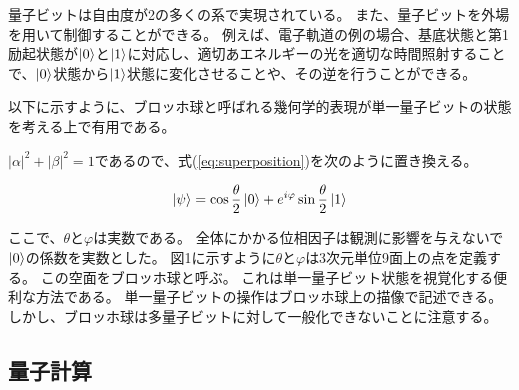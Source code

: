 \documentclass[platex,dvipdfmx]{jlreq}			%
\begin{document}
量子ビットは自由度が2の多くの系で実現されている。
また、量子ビットを外場を用いて制御することができる。
例えば、電子軌道の例の場合、基底状態と第1励起状態が$\ket{0}$と$\ket{1}$に対応し、適切あエネルギーの光を適切な時間照射することで、$\ket{0}$状態から$\ket{1}$状態に変化させることや、その逆を行うことができる。

以下に示すように、ブロッホ球と呼ばれる幾何学的表現が単一量子ビットの状態を考える上で有用である。

$|\alpha|^2 + |\beta|^2 = 1$であるので、式(\ref{eq:superposition})を次のように置き換える。

\begin{eqnarray}
    \ket{\psi} = \cos \frac{\theta}{2} \ket{0} + e^{i \varphi}\sin \frac{\theta}{2} \ket{1}
\end{eqnarray}

ここで、$\theta$と$\varphi$は実数である。
全体にかかる位相因子は観測に影響を与えないで$\ket{0}$の係数を実数とした。
図1に示すように$\theta$と$\varphi$は3次元単位9面上の点を定義する。
この空面をブロッホ球と呼ぶ。
これは単一量子ビット状態を視覚化する便利な方法である。
単一量子ビットの操作はブロッホ球上の描像で記述できる。
しかし、ブロッホ球は多量子ビットに対して一般化できないことに注意する。


\subsection{量子計算}
    
\end{document}
